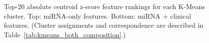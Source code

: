 \begin{figure}[!htbp]
    \caption{
        Top-20 absolute centroid z-score feature rankings for each K-Means cluster.
        Top: miRNA-only features. Bottom: miRNA + clinical features.
        (Cluster assignments and correspondence are described in Table~\ref{tab:kmeans_both_composition}.)
    }
\end{figure}










